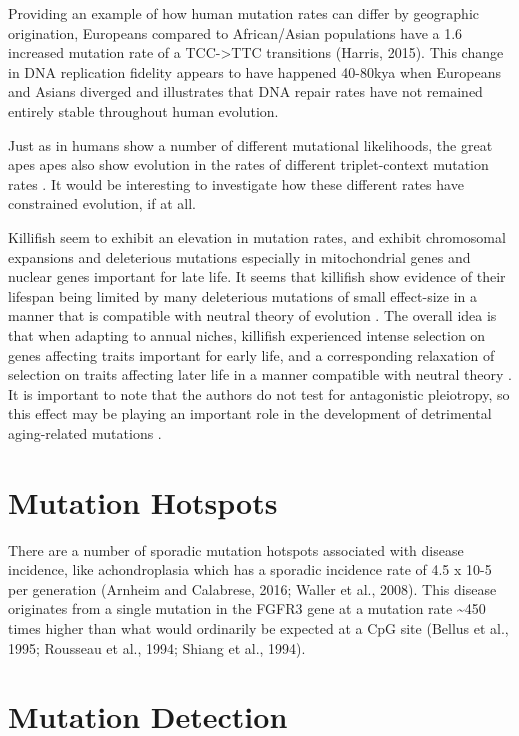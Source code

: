 \documentclass[]{book}
\begin{document}
Providing an example of how human mutation rates can differ by
geographic origination, Europeans compared to African/Asian populations
have a 1.6 increased mutation rate of a TCC-\textgreater{}TTC
transitions (Harris, 2015). This change in DNA replication fidelity
appears to have happened 40-80kya when Europeans and Asians diverged and
illustrates that DNA repair rates have not remained entirely stable
throughout human evolution.

Just as in humans show a number of different mutational likelihoods, the
great apes apes also show evolution in the rates of different
triplet-context mutation rates \citep{harris2017rapid}. It would be
interesting to investigate how these different rates have constrained
evolution, if at all.

Killifish seem to exhibit an elevation in mutation rates, and exhibit
chromosomal expansions and deleterious mutations especially in
mitochondrial genes and nuclear genes important for late life. It seems
that killifish show evidence of their lifespan being limited by many
deleterious mutations of small effect-size in a manner that is
compatible with neutral theory of evolution \citep{ohta1973model}. The
overall idea is that when adapting to annual niches, killifish
experienced intense selection on genes affecting traits important for
early life, and a corresponding relaxation of selection on traits
affecting later life in a manner compatible with neutral theory
\citep{cui2019relaxed}. It is important to note that the authors do not
test for antagonistic pleiotropy, so this effect may be playing an
important role in the development of detrimental aging-related mutations
\citep{charlesworth2000degeneration, williams1957pleiotropy}.

\section{Mutation Hotspots}\label{mutation-hotspots}

There are a number of sporadic mutation hotspots associated with disease
incidence, like achondroplasia which has a sporadic incidence rate of
4.5 x 10-5 per generation (Arnheim and Calabrese, 2016; Waller et al.,
2008). This disease originates from a single mutation in the FGFR3 gene
at a mutation rate \textasciitilde{}450 times higher than what would
ordinarily be expected at a CpG site (Bellus et al., 1995; Rousseau et
al., 1994; Shiang et al., 1994).

\section{Mutation Detection}\label{mutation-detection}
\end{document}
